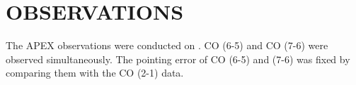 \section{OBSERVATIONS}

The APEX observations were conducted on . CO (6-5) and CO (7-6) were observed simultaneously. The pointing error of CO (6-5) and (7-6) was fixed by comparing them with the CO (2-1) data.